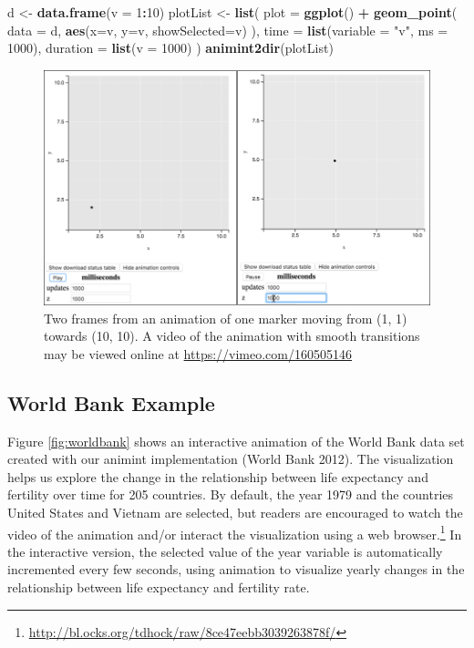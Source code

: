 \documentclass[12pt,]{article}
\newenvironment{Shaded}{\begin{snugshade}}{\end{snugshade}}
\newcommand{\KeywordTok}[1]{\textcolor[rgb]{0.13,0.29,0.53}{\textbf{#1}}}
\newcommand{\DataTypeTok}[1]{\textcolor[rgb]{0.13,0.29,0.53}{#1}}
\newcommand{\DecValTok}[1]{\textcolor[rgb]{0.00,0.00,0.81}{#1}}
\newcommand{\StringTok}[1]{\textcolor[rgb]{0.31,0.60,0.02}{#1}}
\newcommand{\OperatorTok}[1]{\textcolor[rgb]{0.81,0.36,0.00}{\textbf{#1}}}
\newcommand{\NormalTok}[1]{#1}
\let\rmarkdownfootnote\footnote%
\def\footnote{\protect\rmarkdownfootnote}
\theoremstyle{definition}
\theoremstyle{definition}
\theoremstyle{remark}
\begin{document}
\begin{Shaded}
\begin{Highlighting}[]
\NormalTok{d <-}\StringTok{ }\KeywordTok{data.frame}\NormalTok{(}\DataTypeTok{v =} \DecValTok{1}\OperatorTok{:}\DecValTok{10}\NormalTok{)}
\NormalTok{plotList <-}\StringTok{ }\KeywordTok{list}\NormalTok{(}
  \DataTypeTok{plot =} \KeywordTok{ggplot}\NormalTok{() }\OperatorTok{+}\StringTok{ }\KeywordTok{geom_point}\NormalTok{(}
    \DataTypeTok{data =}\NormalTok{ d, }\KeywordTok{aes}\NormalTok{(}\DataTypeTok{x=}\NormalTok{v, }\DataTypeTok{y=}\NormalTok{v, }\DataTypeTok{showSelected=}\NormalTok{v)}
\NormalTok{  ),}
  \DataTypeTok{time =} \KeywordTok{list}\NormalTok{(}\DataTypeTok{variable =} \StringTok{"v"}\NormalTok{, }\DataTypeTok{ms =} \DecValTok{1000}\NormalTok{),}
  \DataTypeTok{duration =} \KeywordTok{list}\NormalTok{(}\DataTypeTok{v =} \DecValTok{1000}\NormalTok{)}
\NormalTok{)}
\KeywordTok{animint2dir}\NormalTok{(plotList)}
\end{Highlighting}
\end{Shaded}

\begin{figure}
\centering
\includegraphics{images/animation}
\caption{\label{fig:animation}Two frames from an animation of one marker
moving from (1, 1) towards (10, 10). A video of the animation with
smooth transitions may be viewed online at
\url{https://vimeo.com/160505146}}
\end{figure}

\subsection{World Bank Example}\label{worldbank}

Figure \ref{fig:worldbank} shows an interactive animation of the World
Bank data set created with our animint implementation (World Bank 2012).
The visualization helps us explore the change in the relationship
between life expectancy and fertility over time for 205 countries. By
default, the year 1979 and the countries United States and Vietnam are
selected, but readers are encouraged to watch the video of the animation
and/or interact the visualization using a web
browser.\footnote{\url{http://bl.ocks.org/tdhock/raw/8ce47eebb3039263878f/}}
In the interactive version, the selected value of the year variable is
automatically incremented every few seconds, using animation to
visualize yearly changes in the relationship between life expectancy and
fertility rate.
\end{document}
